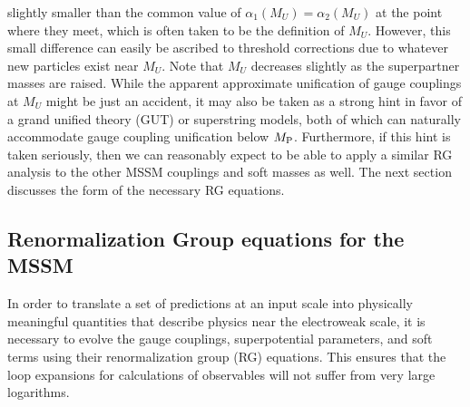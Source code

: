 \documentclass[11pt]{article}
\def\MPlanck{M_{\rm P}}
\begin{document}
slightly smaller than the common value of $\alpha_1(M_U) = \alpha_2(M_U)$
at the point where they meet, which is often taken to be the definition 
of $M_U$. However, this small difference can easily be ascribed to 
threshold corrections due to whatever new particles exist near $M_U$.
Note that $M_U$ decreases slightly as the superpartner masses are 
raised. While 
the apparent approximate unification of gauge couplings at $M_U$ might be 
just an 
accident, it may also be taken as a strong hint in favor of a grand 
unified theory (GUT) or superstring models, both of which can naturally 
accommodate gauge coupling unification below $\MPlanck$. Furthermore, if 
this hint is taken seriously, then we can reasonably expect to be able to 
apply a similar RG analysis to the other MSSM couplings and soft masses as 
well. The next section discusses the form of the necessary RG equations.

\subsection{Renormalization Group equations for the MSSM\label{subsec:RGEs}}
\setcounter{footnote}{1}
\setcounter{equation}{0}

In order to translate a set of predictions at an input scale into 
physically meaningful quantities that describe physics near the 
electroweak scale, it is necessary to evolve the gauge couplings, 
superpotential parameters, and soft terms using their renormalization 
group (RG) equations. This ensures that the loop expansions for 
calculations of observables will not suffer from very large logarithms.
\end{document}
